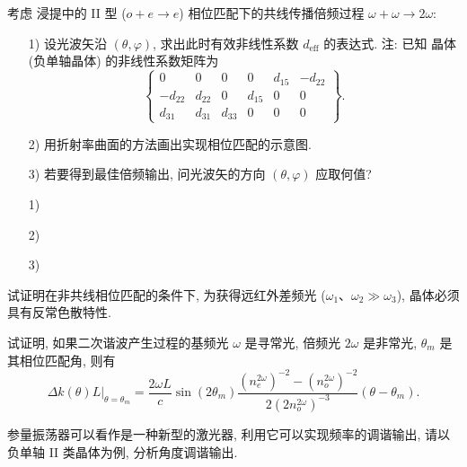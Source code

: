 \documentclass{assignment}
\begin{document}
\begin{prob}
    考虑  浸提中的 II 型 ($o+e\rightarrow e$) 相位匹配下的共线传播倍频过程 $\omega+\omega\rightarrow 2\omega$:
    \begin{itemize}
        \item[1)] 设光波矢沿 $(\theta,\varphi)$, 求出此时有效非线性系数 $d_{\text{eff}}$ 的表达式.
        注: 已知  晶体 (负单轴晶体) 的非线性系数矩阵为
        \[
            \begin{Bmatrix}
                0&0&0&0&d_{15}&-d_{22}\\
                -d_{22}&d_{22}&0&d_{15}&0&0\\
                d_{31}&d_{31}&d_{33}&0&0&0
            \end{Bmatrix}.
        \]
        \item[2)] 用折射率曲面的方法画出实现相位匹配的示意图.
        \item[3)] 若要得到最佳倍频输出, 问光波矢的方向 $(\theta,\varphi)$ 应取何值?
    \end{itemize}
\end{prob}
\begin{sol}
    \begin{itemize}
        \item[1)] 
        \item[2)] 
        \item[3)] 
    \end{itemize}
\end{sol}

\begin{prob}
    试证明在非共线相位匹配的条件下, 为获得远红外差频光 ($\omega_1$、$\omega_2\gg\omega_3$), 晶体必须具有反常色散特性.
\end{prob}
\begin{pf}
    
\end{pf}

\begin{prob}
    试证明, 如果二次谐波产生过程的基频光 $\omega$ 是寻常光, 倍频光 $2\omega$ 是非常光, $\theta_m$ 是其相位匹配角, 则有
    \[
        \Delta k(\theta)L|_{\theta=\theta_m}=\frac{2\omega L}{c}\sin(2\theta_m)\frac{(n_e^{2\omega})^{-2}-(n_o^{2\omega})^{-2}}{2(2n_o^{2\omega})^{-3}}(\theta-\theta_m).
    \]
\end{prob}
\begin{pf}
    
\end{pf}

\begin{prob}
    参量振荡器可以看作是一种新型的激光器, 利用它可以实现频率的调谐输出, 请以负单轴 II 类晶体为例, 分析角度调谐输出.
\end{prob}
\begin{sol}
    
\end{sol}
\end{document}
